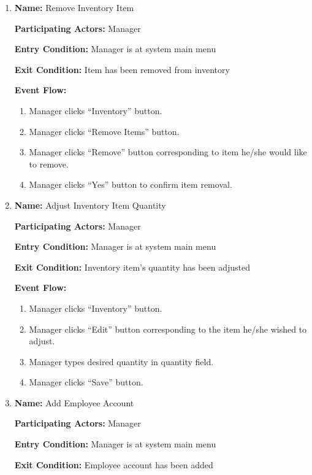 \documentclass[11pt]{article}
\begin{document}
\begin{enumerate}
		\item \textbf{Name:} 				Remove Inventory Item

			\textbf{Participating Actors:} 	Manager

			\textbf{Entry Condition:} 		Manager is at system main menu

			\textbf{Exit Condition:} 		Item has been removed from inventory

			\textbf{Event Flow:}
			\begin{enumerate}
				\setlength{\leftskip}{1cm}
				\item Manager clicks ``Inventory'' button.
				\item Manager clicks ``Remove Items'' button.
				\item Manager clicks ``Remove'' button corresponding to item he/she would like to remove.
				\item Manager clicks ``Yes'' button to confirm item removal.\\
			\end{enumerate}

		\item \textbf{Name:} 				Adjust Inventory Item Quantity

			\textbf{Participating Actors:} 	Manager

			\textbf{Entry Condition:} 		Manager is at system main menu

			\textbf{Exit Condition:} 		Inventory item's quantity has been adjusted

			\textbf{Event Flow:}
			\begin{enumerate}
				\setlength{\leftskip}{1cm}
				\item Manager clicks ``Inventory'' button.
				\item Manager clicks ``Edit'' button corresponding to the item he/she wished to adjust.
				\item Manager types desired quantity in quantity field.
				\item Manager clicks ``Save'' button.\\
			\end{enumerate}

		\newpage

		\item \textbf{Name:} 				Add Employee Account

			\textbf{Participating Actors:} 	Manager

			\textbf{Entry Condition:} 		Manager is at system main menu

			\textbf{Exit Condition:} 		Employee account has been added


\end{enumerate}
\end{document}
